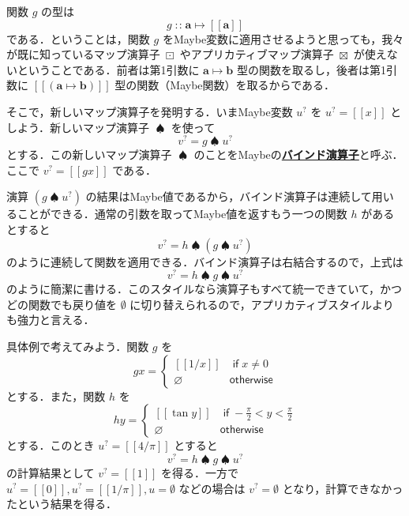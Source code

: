\documentclass[a4paper,twocolumn]{jsbook}
\def\[{\left[\!\left[}
\def\]{\right]\!\right]}
\newcommand{\keyword}[1]{{\underline{\textbf{#1}}}}
\newcommand{\mKeyword}[1]{\mathsf{#1}} %
\newcommand{\mIfKeyword}{\mKeyword{if}}
\newcommand{\mOtherwiseKeyword}{\mKeyword{otherwise}}
\DeclareMathOperator{\mIf}{\mIfKeyword}
\DeclareMathOperator{\mOtherwise}{\mOtherwiseKeyword}
\newcommand{\mNothing}{\emptyset}
\newcommand{\mPureNothing}{\varnothing}
\DeclareMathOperator{\mAppMapMaybe}{\boxtimes}
\DeclareMathOperator{\mBindMaybe}{\spadesuit}
\DeclareMathOperator{\mIn}{{:\!:}}
\DeclareMathOperator{\mMapMaybe}{\boxdot}
\DeclareMathOperator{\mMapsTo}{\mapsto}
\newcommand{\mType}[1]{\mathbf{#1}}
\newcommand{\mMaybeWith}[1]{\[#1\]}
\newcommand{\mMaybeType}[1]{\mMaybeWith{\mType{#1}}}
\newcommand{\mMaybe}[1]{{#1}^\text{?}}
\newcommand{\mProj}[2]{#1\mMapsTo#2}
\begin{document}
関数 $g$ の型は
\begin{equation}
g\mIn\mProj{\mType{a}}{\mMaybeType{a}}
\end{equation}
である．ということは，関数 $g$ をMaybe変数に適用させるようと思っても，我々が既に知っているマップ演算子 $\mMapMaybe$ やアプリカティブマップ演算子 $\mAppMapMaybe$ が使えないということである．前者は第1引数に $\mProj{\mType{a}}{\mType{b}}$ 型の関数を取るし，後者は第1引数に $\mMaybeWith{(\mProj{\mType{a}}{\mType{b}})}$ 型の関数（Maybe関数）を取るからである． %

そこで，新しいマップ演算子を発明する．いまMaybe変数 $\mMaybe{u}$ を $\mMaybe{u}=\mMaybeWith{x}$ としよう．新しいマップ演算子 $\mBindMaybe$ を使って
\begin{equation}
\mMaybe{v}=g\mBindMaybe\mMaybe{u}
\end{equation}
とする．この新しいマップ演算子 $\mBindMaybe$ のことをMaybeの\keyword{バインド演算子}と呼ぶ．ここで $\mMaybe{v}=\mMaybeWith{gx}$ である．

演算 $(g\mBindMaybe\mMaybe{u})$ の結果はMaybe値であるから，バインド演算子は連続して用いることができる．通常の引数を取ってMaybe値を返すもう一つの関数 $h$ があるとすると
\begin{equation}
\mMaybe{v}=h\mBindMaybe{}(g\mBindMaybe\mMaybe{u})
\end{equation}
のように連続して関数を適用できる．バインド演算子は右結合するので，上式は
\begin{equation}
\label{eq:maybe-z-bind-style}
\mMaybe{v}=h\mBindMaybe g\mBindMaybe\mMaybe{u}
\end{equation}
のように簡潔に書ける．このスタイルなら演算子もすべて統一できていて，かつどの関数でも戻り値を $\mNothing$ に切り替えられるので，アプリカティブスタイルよりも強力と言える．

具体例で考えてみよう．関数 $g$ を
\begin{equation}
gx=\begin{cases}
\mMaybeWith{1/x}&\mIf x\neq0\\
\mPureNothing&\mOtherwise
\end{cases}
\end{equation}
とする．また，関数 $h$ を
\begin{equation}
hy=\begin{cases}
\mMaybeWith{\tan y}&\mIf -\frac{\pi}{2}<y<\frac{\pi}{2}\\
\mPureNothing&\mOtherwise
\end{cases}
\end{equation}
とする．このとき $\mMaybe{u}=\mMaybeWith{4/\pi}$ とすると
\begin{equation}
\mMaybe{v}=h\mBindMaybe g\mBindMaybe\mMaybe{u}
\end{equation}
の計算結果として $\mMaybe{v}=\mMaybeWith{1}$ を得る．一方で $\mMaybe{u}=\mMaybeWith{0},\mMaybe{u}=\mMaybeWith{1/\pi},u=\mNothing$ などの場合は $\mMaybe{v}=\mNothing$ となり，計算できなかったという結果を得る．
\end{document}
